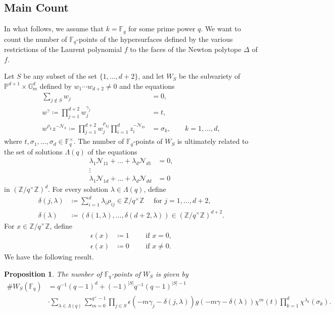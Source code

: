\documentclass[11pt, reqno]{amsart}
\theoremstyle{plain}
\newtheorem{prop}[theo]{Proposition}
\theoremstyle{definition}
\newcommand{\Z}{\mathbb{Z}}
\newcommand{\F}{\mathbb{F}}
\newcommand{\G}{\mathbb{G}}
\begin{document}
\subsection{Main Count}
In what follows, we assume that $k= \F_q$ for some prime power $q.$ 
We want to count the number of $\F_q$-points of the hypersurfaces defined by the various restrictions of the Laurent polynomial $f$ to the faces of the Newton polytope $\Delta$ of $f$.  

Let $S$ be any subset of the set $\{1,\dots,d+2\}$, and let $W_{S}$ be the subvariety of $\mathbb{P}^{d+1} \times \G_m^{d}$ defined by $ w_1\cdots w_{d+2} \neq 0$ and the equations
\begin{align*}
    \sum_{j \notin S} w_{j} &= 0,\\
    w^{\gamma}\coloneqq\prod_{j=1}^{d+2} w_j^{\gamma_j} &=t, \\
    w^{\rho_k} z^{-\mathcal{N}_k} \coloneqq \prod_{j=1}^{d+2} w_j^{\rho_{kj}} \prod_{i=1}^d z_i^{-\mathcal{N}_{ki}} &= \sigma_k, \qquad k=1,\dots,d,
\end{align*}
where $t, \sigma_1,\dots,\sigma_d \in \F_q^\times$. 
The number of $\F_q$-points of $W_S$ is ultimately related to the set of solutions $\Lambda(q)$ of the equations 
\begin{align*}
    \lambda_1 \mathcal{N}_{11}+ \dots +\lambda_d \mathcal{N}_{d1}&=0,\\
    \vdots \\
    \lambda_1 \mathcal{N}_{1d}+ \dots +\lambda_d \mathcal{N}_{dd}&=0
\end{align*}
in $\left(\mathbb{Z}/q^\times\mathbb{Z}\right)^{d}$. 
For every solution $\lambda \in \Lambda(q)$, define 
\begin{align*}
    \delta(j,\lambda) &\coloneqq \sum_{i=1}^d \lambda_i \rho_{ij} \in \Z/q^\times\Z \quad \text{ for } j=1,\dots, d+2 ,\\
    \delta(\lambda) &\coloneqq (\delta(1,\lambda),\dots,\delta(d+2,\lambda)) \in \left(\Z/q^\times \Z\right)^{d+2}.
\end{align*}
For $x \in \Z/q^\times\Z$, define 
\begin{align*}
    \epsilon(x) &\coloneqq 1  \qquad \text{ if } x=0 , \\
    \epsilon(x) &\coloneqq 0  \qquad \text{ if } x\neq 0.
\end{align*}
We have the following result.
\begin{prop}\label{prop:main-count}
The number of $\F_q$-points of $W_S$ is given by
\begin{align*}
     \#W_{S} (\mathbb{F}_q) &= q^{-1}(q-1)^{d} + (-1)^{|S|}q^{-1}(q-1)^{|S|-1} \\
     &\cdot \sum_{\lambda \in \Lambda(q)}   \sum_{m=0}^{q^\times-1} \prod_{j\in S} \epsilon\left( -m \gamma_j -\delta(j,\lambda) \right) g\left(-m\gamma - \delta(\lambda)\right) \chi^{m}(t) \prod_{k=1}^d \chi^{\lambda_k}(\sigma_k).
\end{align*}
\end{prop}
\end{document}
